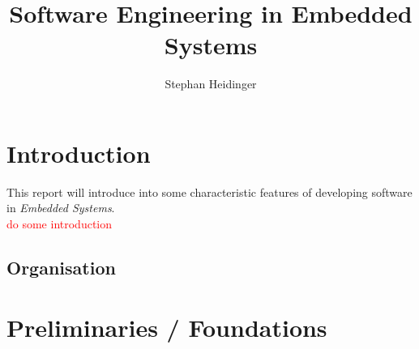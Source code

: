 \documentclass[10pt,a4paper,titlepage,draft]{report} %
\author{Stephan Heidinger}
\title{Software Engineering in Embedded Systems}
\newcommand{\red}[1]
{\textcolor{red}{#1}}
\begin{document}
\maketitle

{
    \fancyhead{}
    \fancyfoot{}
}	%
\tableofcontents
\newpage
{
    \fancyhead{}
}	%
\setcounter{page}{1} %


\section{Introduction}

This report will introduce into some characteristic features of developing software in \emph{Embedded Systems}.
\\ \red{do some introduction}





\subsection{Organisation}



\section{Preliminaries / Foundations}
\end{document}
